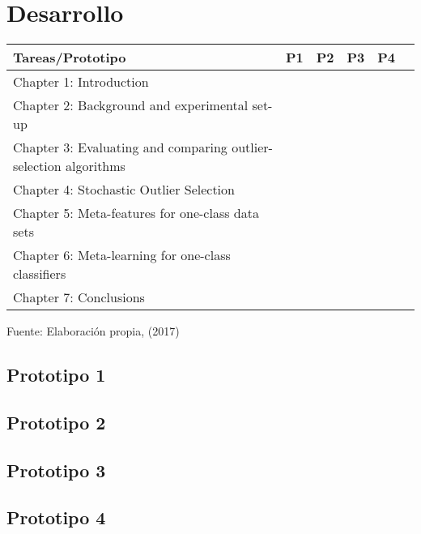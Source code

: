 \section{Desarrollo}

\begin{table}[htb]
\centering
{}
\begin{tabular}{lccccc}\toprule
Tareas/Prototipo&P1&P2&P3&P4\\
\midrule
\rowcolor[gray]{0.9}
Chapter 1: Introduction 											& \y & \y & \y & \y \\
Chapter 2: Background and experimental set-up 						&    & \y & \y & \y \\
\rowcolor[gray]{0.9}
Chapter 3: Evaluating and comparing outlier-selection algorithms 	&    & \y &    &    \\
Chapter 4: Stochastic Outlier Selection 							&    &    & \y &    \\
\rowcolor[gray]{0.9}
Chapter 5: Meta-features for one-class data sets 					&    &    &    & \y \\
Chapter 6: Meta-learning for one-class classifiers 					&    &    &    & \y \\
\rowcolor[gray]{0.9}
Chapter 7: Conclusions  											& \y & \y & \y & \y \\
\bottomrule
\end{tabular}
\medskip
\par\centering Fuente: Elaboración propia, (2017)
\end{table}


\subsection{Prototipo 1}

\subsection{Prototipo 2}

\subsection{Prototipo 3}

\subsection{Prototipo 4}